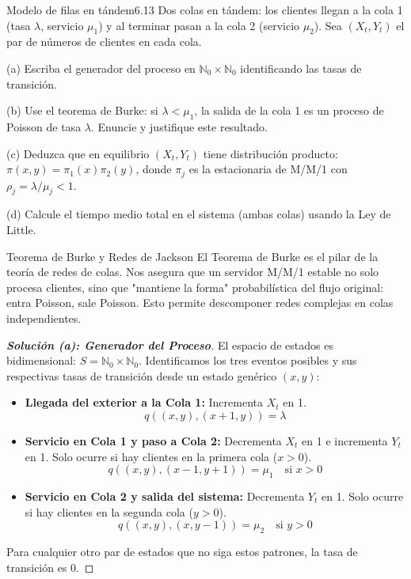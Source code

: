 \documentclass[10pt,a4paper]{article}
\begin{document}
\begin{ejercicio}{Modelo de filas en tándem}{6.13}
    Dos colas en tándem: los clientes llegan a la cola 1 (tasa $\lambda$, servicio $\mu_1$) y al terminar pasan a la cola 2 (servicio $\mu_2$). Sea $(X_t, Y_t)$ el par de números de clientes en cada cola.
    
    (a) Escriba el generador del proceso en $\mathbb{N}_0 \times \mathbb{N}_0$ identificando las tasas de transición.
    
    (b) Use el teorema de Burke: si $\lambda < \mu_1$, la salida de la cola 1 es un proceso de Poisson de tasa $\lambda$. Enuncie y justifique este resultado.
    
    (c) Deduzca que en equilibrio $(X_t, Y_t)$ tiene distribución producto: $\pi(x, y) = \pi_1(x)\pi_2(y)$, donde $\pi_j$ es la estacionaria de M/M/1 con $\rho_j = \lambda/\mu_j < 1$.
    
    (d) Calcule el tiempo medio total en el sistema (ambas colas) usando la Ley de Little.
\end{ejercicio}

\vspace{2mm}

\begin{nota}{Teorema de Burke y Redes de Jackson}
    El Teorema de Burke es el pilar de la teoría de redes de colas. Nos asegura que un servidor M/M/1 estable no solo procesa clientes, sino que "mantiene la forma" probabilística del flujo original: entra Poisson, sale Poisson. Esto permite descomponer redes complejas en colas independientes.
\end{nota}

\begin{proof}[\textbf{Solución (a): Generador del Proceso}]
    El espacio de estados es bidimensional: $S = \mathbb{N}_0 \times \mathbb{N}_0$.
    Identificamos los tres eventos posibles y sus respectivas tasas de transición desde un estado genérico $(x, y)$:
    
    \begin{itemize}
        \item \textbf{Llegada del exterior a la Cola 1:} Incrementa $X_t$ en 1.
        \[ q((x, y), (x+1, y)) = \lambda \]
        
        \item \textbf{Servicio en Cola 1 y paso a Cola 2:} Decrementa $X_t$ en 1 e incrementa $Y_t$ en 1. Solo ocurre si hay clientes en la primera cola ($x > 0$).
        \[ q((x, y), (x-1, y+1)) = \mu_1 \quad \text{si } x > 0 \]
        
        \item \textbf{Servicio en Cola 2 y salida del sistema:} Decrementa $Y_t$ en 1. Solo ocurre si hay clientes en la segunda cola ($y > 0$).
        \[ q((x, y), (x, y-1)) = \mu_2 \quad \text{si } y > 0 \]
    \end{itemize}
    Para cualquier otro par de estados que no siga estos patrones, la tasa de transición es $0$.
\end{proof}
\end{document}
